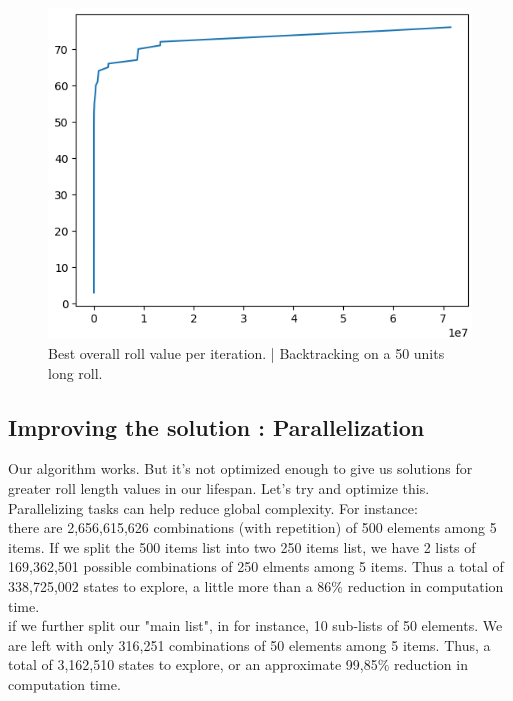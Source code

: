 \documentclass{modeleRapport}
\begin{document}
\begin{figure}[h]
    \centering
    \includegraphics[width=12cm]{Images/ValuePlot_roll50.png}
    \caption{Best overall roll value per iteration. | Backtracking on a 50 units long roll.}
\end{figure}

\newpage

\subsection{Improving the solution : Parallelization}

Our algorithm works. But it's not optimized enough to give us solutions for greater roll length values in our lifespan. Let's try and optimize this.\\

Parallelizing tasks can help reduce global complexity. For instance:\\ there are 2,656,615,626 combinations (with repetition)
of 500 elements among 5 items. If we split the 500 items list into two 250 items list, we have 2 lists of 169,362,501 possible 
combinations of 250 elments among 5 items. Thus a total of 338,725,002 states to explore, a little more than a 86\% 
reduction in computation time.\\

if we further split our "main list", in for instance, 10 sub-lists of 50 elements. 
We are left with only 316,251 combinations of 50 elements among 5 items. 
Thus, a total of 3,162,510 states to explore, or an approximate 99,85\% reduction in computation time.\\
\end{document}
